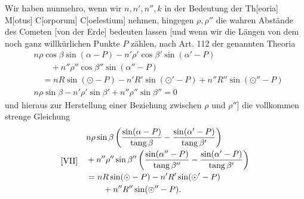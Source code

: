 Wir haben nunmehro, wenn wir \(n,n',n'',k\) in der Bedeutung der Th[eoria] M[otus] C[orporum] C[oelestium] nehmen, hingegen \(\rho,\rho''\) die wahren Abstände des Cometen [von der Erde] bedeuten lassen [und wenn wir die Längen von dem noch ganz willkürlichen Punkte \(P\) zählen, nach Art. 112 der genannten
Theoria
\[
\begin{aligned}
&n\rho\cos\beta\sin(\alpha-P)-n'\rho'\cos\beta'\sin(\alpha'-P)\\
&\qquad{}+n''\rho''\cos\beta''\sin(\alpha''-P)\\
&\quad=nR\sin(\odot-P)-n'R'\sin(\odot'-P)+n''R''\sin(\odot''-P)\\
&n\rho\sin\beta-n'\rho'\sin\beta'+n''\rho''\sin\beta''=0
\end{aligned}
\]
und hieraus zur Herstellung einer Beziehung zwischen \(\rho\) und \(\rho''\)] die vollkommen strenge Gleichung
\[
\begin{array}{l@{\quad}l}
[\mathrm{VII}]&\begin{aligned}
&n\rho\sin\beta\left(\frac{\sin(\alpha-P)}{\operatorname{tang}\beta}-\frac{\sin(\alpha'-P)}{\operatorname{tang}\beta'}\right)\\
&{}+n''\rho''\sin\beta''\left(\frac{\sin(\alpha''-P)}{\operatorname{tang}\beta''}-\frac{\sin(\alpha'-P)}{\operatorname{tang}\beta'}\right)\\
&=nR\sin(\odot-P)-n'R'\sin(\odot'-P)\\
&\qquad{}+n''R''\sin(\odot''-P).
\end{aligned}
\end{array}
\]

